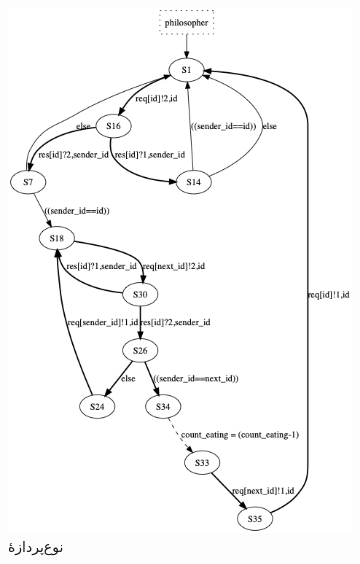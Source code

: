 \documentclass[12pt, logo=tehranReport/logo]{tehranReport}
\begin{document}
\begin{figure}[H]
\centering
\begin{subfigure}[t]{0.4\textwidth}
    \centering
    \includegraphics[width=\textwidth]{philosopher}
    \caption{نوع‌پردازهٔ }
\end{subfigure}
~
\begin{subfigure}[t]{0.4\textwidth}
    \centering

\end{subfigure}
\end{figure}
\end{document}

